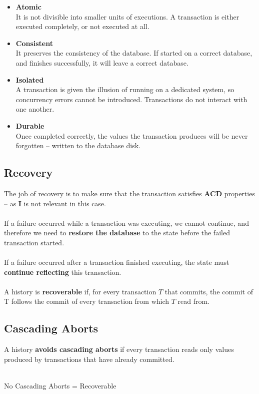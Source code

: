 \documentclass{article}
\begin{document}
\begin{itemize}
	\item \textbf{Atomic}
	\vspace{.2cm} \\
	It is not divisible into smaller units of executions. A transaction is either executed completely, or not executed at all.
	
	\item \textbf{Consistent}
	\vspace{.2cm} \\
	It preserves the consistency of the database. If started on a correct database, and finishes successfully, it will leave a correct database.
	
	\item \textbf{Isolated}
	\vspace{.2cm} \\
	A transaction is given the illusion of running on a dedicated system, so concurrency errors cannot be introduced. Transactions do not interact with one another.
	
	\item \textbf{Durable}
	\vspace{.2cm} \\
	Once completed correctly, the values the transaction produces will be never forgotten -- written to the database disk.
\end{itemize}

\subsection{Recovery}
The job of recovery is to make sure that the transaction satisfies \textbf{ACD} properties -- as \textbf{I} is not relevant in this case. \\ \\
If a failure occurred while a transaction was executing, we cannot continue, and therefore we need to \textbf{restore the database} to the state before the failed transaction started. \\ \\
If a failure occurred after a transaction finished executing, the state must \textbf{continue reflecting} this transaction. \\ \\
A history is \textbf{recoverable} if, for every transaction $T$ that commits, the commit of T follows the commit of every transaction from which $T$ read from.

\subsection{Cascading Aborts}
A history \textbf{avoids cascading aborts} if every transaction reads only values produced by transactions that have already committed. \\ \\
\centerline{No Cascading Aborts = Recoverable}
\end{document}
